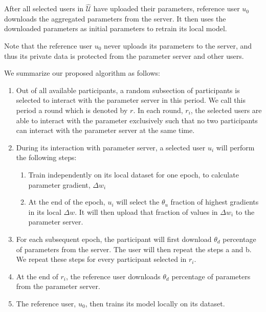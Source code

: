 \documentclass[letterpaper]{article}
\begin{document}
\begin{flushleft}
{%
After all selected users in $\hat{\mathcal{U}}$ have uploaded their parameters, reference user $u_0$ downloads the aggregated
parameters from the server. It then uses the downloaded parameters as initial parameters to retrain its local model. 

Note that the reference user  $u_0$ never uploads its parameters to the server, and thus its private data is protected from the
parameter server and other users. 


We summarize our proposed algorithm as follows:
\begin {enumerate}
\item Out of all available participants, a random subsection of participants is selected to interact with the parameter server in this
period. We call this period a round which is denoted by $r$. In each round, $r_i$, the selected users are able to interact with the parameter exclusively such that no two
participants can interact with the parameter server at the same time.
\item During its interaction with parameter server, a selected user $u_i$ will perform the following steps:
\begin {enumerate}
  \item Train independently on its local dataset for one epoch, to calculate parameter gradient, $\Delta w_i$ 
  \item  At the end of the epoch, $u_i$ will select the $\theta_u$ fraction of highest gradients in its local $\Delta w$. It will then upload that fraction of values in $\Delta w_i$ to the parameter server.
  \end {enumerate}
\item For each subsequent epoch, the participant will first download $\theta_d$ percentage of parameters from the server. The
user will then repeat the steps a and b. We repeat these steps for every participant selected in $r_i$.
\item At the end of $r_i$, the reference user downloads $\theta_d$ percentage of parameters from the parameter server.
\item The reference user, $u_0$, then trains its model locally on its dataset. 
\end {enumerate}

}
\end{flushleft}
\end{document}
